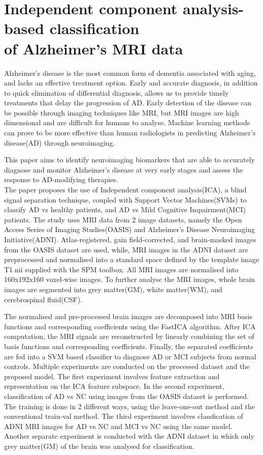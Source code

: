 \documentclass[11pt]{article}
\begin{document}
  \section*{Independent component analysis-based classification \\of Alzheimer's MRI data}
  Alzheimer's disease is the most common form of dementia associated with aging, and lacks an effective treatment option. Early and accurate diagnosis, in addition to quick elimination of differential diagnosis, allows us to provide timely treatments that delay the progression of AD. Early detection of the disease can be possible through imaging techniques like MRI, but MRI images are high dimensional and are difficult for humans to analyse. Machine learning methods can prove to be more effective than human radiologists in predicting Alzheimer’s disease(AD) through neuroimaging.

  This paper aims to identify neuroimaging biomarkers that are able to accurately diagnose and monitor Alzheimer’s disease at very early stages and assess the response to AD-modifying therapies.\\

  The paper proposes the use of Independent component analysis(ICA), a blind signal separation technique, coupled with Support Vector Machines(SVMs) to classify AD vs healthy patients, and AD vs Mild Cognitive Impairment(MCI) patients.
  The study uses MRI data from 2 image datasets, namely the Open Access Series of Imaging Studies(OASIS) and Alzheimer’s Disease Neuroimaging Initiative(ADNI).
  Atlas-registered, gain field-corrected, and brain-masked images from the OASIS dataset are used, while,
  MRI images in the ADNI dataset are preprocessed and normalised into a standard space defined by the template image T1.nii supplied with the SPM toolbox.
  All MRI images are normalised into 160x192x160 voxel-wise images.
  To further analyse the MRI images, whole brain images are segmented into grey matter(GM), white matter(WM), and cerebrospinal fluid(CSF).

  The normalised and pre-processed brain images are decomposed into MRI basis functions and corresponding coefficients using the FastICA algorithm. 
  After ICA computation, the MRI signals are reconstructed by linearly combining the set of basis functions and corresponding coefficients.
  Finally, the separated coefficients are fed into a SVM based classifier to diagnose AD or MCI subjects from normal controls.
  Multiple experiments are conducted on the processed dataset and the proposed model.
  The first experiment involves feature extraction and representation on the ICA feature subspace.
  In the second experiment, classification of AD vs NC using images from the OASIS dataset is performed. The training is done in 2 different ways, using the leave-one-out method and the conventional train-val method.
  The third experiment involves classfication of ADNI MRI images for AD vs NC and MCI vs NC using the same model.
  Another separate experiment is conducted with the ADNI dataset in which only grey matter(GM) of the brain was analysed for classification.\\
\end{document}
